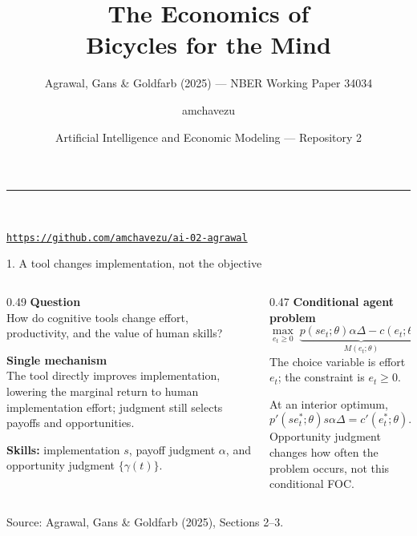 \documentclass[aspectratio=169,11pt]{beamer}
\title{The Economics of\\Bicycles for the Mind}
\subtitle{Agrawal, Gans \& Goldfarb (2025) --- NBER Working Paper 34034}
\author{amchavezu}
\date{Artificial Intelligence and Economic Modeling --- Repository 2}
\begin{document}
\begin{frame}[plain]
  \vspace{0.55cm}
  {\color{Gold}\rule{1.2cm}{3pt}}\\[0.35cm]
  {\color{Ink}\inserttitle\par}
  \vspace{0.25cm}
  {\color{Muted}\insertsubtitle\par}
  \vfill
  {\large\insertauthor}\par
  \vspace{0.20cm}
  {\small\insertdate}\par
  \vspace{0.35cm}
  {\small\href{https://github.com/amchavezu/ai-02-agrawal}{%
    \color{Teal}\texttt{https://github.com/amchavezu/ai-02-agrawal}}}
  \vspace{0.35cm}
\end{frame}

\begin{frame}{1. A tool changes implementation, not the objective}
  \begin{columns}[T,onlytextwidth]
    \begin{column}{0.49\textwidth}
      {\color{Teal}\textbf{Question}}\\[-1pt]
      How do cognitive tools change effort, productivity, and the value of human skills?

      \medskip
      {\color{Teal}\textbf{Single mechanism}}\\[-1pt]
      The tool directly improves implementation, lowering the marginal return to human
      implementation effort; judgment still selects payoffs and opportunities.

      \medskip
      \footnotesize
      \textbf{Skills:} implementation \(s\), payoff judgment \(\alpha\), and opportunity
      judgment \(\{\gamma(t)\}\).
    \end{column}
    \begin{column}{0.47\textwidth}
      {\color{Teal}\textbf{Conditional agent problem}}
      \[
        \max_{e_t\geq0}\;
        \underbrace{p(se_t;\theta)\alpha\Delta-c(e_t;\theta)}_{M(e_t;\theta)}.
      \]
      The choice variable is effort \(e_t\); the constraint is \(e_t\geq0\).

      \medskip
      At an interior optimum,
      \[
        p'(se_t^*;\theta)s\alpha\Delta=c'(e_t^*;\theta).
      \]
      \footnotesize Opportunity judgment changes how often the problem occurs, not this
      conditional FOC.
    \end{column}
  \end{columns}
  \vfill
  {\color{Muted}\scriptsize Source: Agrawal, Gans \& Goldfarb (2025), Sections 2--3.}
\end{frame}
\end{document}
